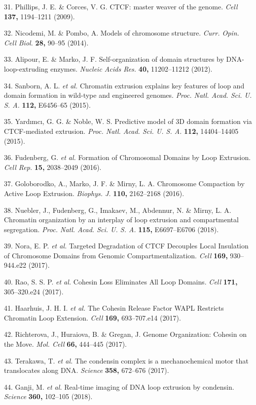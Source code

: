 \documentclass[11pt,twoside]{MPIthesis}
\theoremstyle{definition}
\theoremstyle{definition}
\theoremstyle{definition}
\theoremstyle{remark}
\begin{document}
31. Phillips, J. E. \& Corces, V. G. CTCF: master weaver of the genome.
\emph{Cell} \textbf{137,} 1194--1211 (2009).

32. Nicodemi, M. \& Pombo, A. Models of chromosome structure.
\emph{Curr. Opin. Cell Biol.} \textbf{28,} 90--95 (2014).

33. Alipour, E. \& Marko, J. F. Self-organization of domain structures
by DNA-loop-extruding enzymes. \emph{Nucleic Acids Res.} \textbf{40,}
11202--11212 (2012).

34. Sanborn, A. L. \emph{et al.} Chromatin extrusion explains key
features of loop and domain formation in wild-type and engineered
genomes. \emph{Proc. Natl. Acad. Sci. U. S. A.} \textbf{112,} E6456--65
(2015).

35. Yardımcı, G. G. \& Noble, W. S. Predictive model of 3D domain
formation via CTCF-mediated extrusion. \emph{Proc. Natl. Acad. Sci. U.
S. A.} \textbf{112,} 14404--14405 (2015).

36. Fudenberg, G. \emph{et al.} Formation of Chromosomal Domains by Loop
Extrusion. \emph{Cell Rep.} \textbf{15,} 2038--2049 (2016).

37. Goloborodko, A., Marko, J. F. \& Mirny, L. A. Chromosome Compaction
by Active Loop Extrusion. \emph{Biophys. J.} \textbf{110,} 2162--2168
(2016).

38. Nuebler, J., Fudenberg, G., Imakaev, M., Abdennur, N. \& Mirny, L.
A. Chromatin organization by an interplay of loop extrusion and
compartmental segregation. \emph{Proc. Natl. Acad. Sci. U. S. A.}
\textbf{115,} E6697--E6706 (2018).

39. Nora, E. P. \emph{et al.} Targeted Degradation of CTCF Decouples
Local Insulation of Chromosome Domains from Genomic
Compartmentalization. \emph{Cell} \textbf{169,} 930--944.e22 (2017).

40. Rao, S. S. P. \emph{et al.} Cohesin Loss Eliminates All Loop
Domains. \emph{Cell} \textbf{171,} 305--320.e24 (2017).

41. Haarhuis, J. H. I. \emph{et al.} The Cohesin Release Factor WAPL
Restricts Chromatin Loop Extension. \emph{Cell} \textbf{169,}
693--707.e14 (2017).

42. Richterova, J., Huraiova, B. \& Gregan, J. Genome Organization:
Cohesin on the Move. \emph{Mol. Cell} \textbf{66,} 444--445 (2017).

43. Terakawa, T. \emph{et al.} The condensin complex is a
mechanochemical motor that translocates along DNA. \emph{Science}
\textbf{358,} 672--676 (2017).

44. Ganji, M. \emph{et al.} Real-time imaging of DNA loop extrusion by
condensin. \emph{Science} \textbf{360,} 102--105 (2018).
\end{document}
